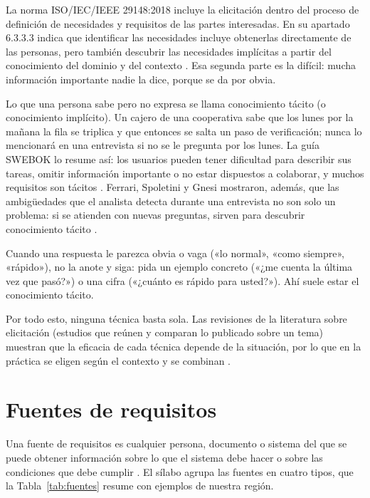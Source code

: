 \documentclass[11pt,a4paper,oneside]{report}
\begin{document}
La norma ISO/IEC/IEEE 29148:2018 incluye la elicitación dentro del proceso de definición de necesidades y requisitos de las partes interesadas. En su apartado 6.3.3.3 indica que identificar las necesidades incluye obtenerlas directamente de las personas, pero también descubrir las necesidades implícitas a partir del conocimiento del dominio y del contexto \citep{iso29148_2018}. Esa segunda parte es la difícil: mucha información importante nadie la dice, porque se da por obvia.

Lo que una persona sabe pero no expresa se llama conocimiento tácito (o conocimiento implícito). Un cajero de una cooperativa sabe que los lunes por la mañana la fila se triplica y que entonces se salta un paso de verificación; nunca lo mencionará en una entrevista si no se le pregunta por los lunes. La guía SWEBOK lo resume así: los usuarios pueden tener dificultad para describir sus tareas, omitir información importante o no estar dispuestos a colaborar, y muchos requisitos son tácitos \citep{swebok_v4_2024}. Ferrari, Spoletini y Gnesi mostraron, además, que las ambigüedades que el analista detecta durante una entrevista no son solo un problema: si se atienden con nuevas preguntas, sirven para descubrir conocimiento tácito \citep{ferrari_2016}.

\begin{enlapractica}
	Cuando una respuesta le parezca obvia o vaga («lo normal», «como siempre», «rápido»), no la anote y siga: pida un ejemplo concreto («¿me cuenta la última vez que pasó?») o una cifra («¿cuánto es rápido para usted?»). Ahí suele estar el conocimiento tácito.
\end{enlapractica}

Por todo esto, ninguna técnica basta sola. Las revisiones de la literatura sobre elicitación (estudios que reúnen y comparan lo publicado sobre un tema) muestran que la eficacia de cada técnica depende de la situación, por lo que en la práctica se eligen según el contexto y se combinan \citep{zowghi_coulin_2005,pacheco_2018}.

\section{Fuentes de requisitos}

Una fuente de requisitos es cualquier persona, documento o sistema del que se puede obtener información sobre lo que el sistema debe hacer o sobre las condiciones que debe cumplir \citep{ireb_cpre_fl_2026,pohl_2025}. El sílabo agrupa las fuentes en cuatro tipos, que la Tabla~\ref{tab:fuentes} resume con ejemplos de nuestra región.
\end{document}
